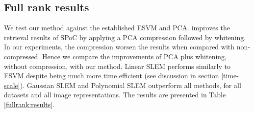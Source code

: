 



\subsection{Full rank results}

We test our method against the established ESVM and PCA.
\cite{babenko15} improves the retrieval results of SPoC by applying a PCA compression followed by whitening. In our experiments, the compression worsen the results when compared with non-compressed.
Hence we compare the improvements of PCA plus whitening, without compression, with our method.
Linear SLEM performs similarly to ESVM despite being much more time efficient (see discussion in section \ref{time-scale}).
Gaussian SLEM and Polynomial SLEM outperform all methods, for all datasets and all image representations.
The results are presented in Table \ref{fullrank:results}.


